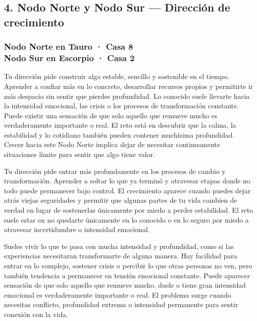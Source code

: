 \documentclass[11pt,a4paper]{article}
\begin{document}
\vspace{0.5cm}


\subsection{4. Nodo Norte y Nodo Sur — Dirección de crecimiento}

\subsubsection*{Nodo Norte en Tauro · Casa 8 \\
Nodo Sur en Escorpio · Casa 2}

Tu dirección pide construir algo estable, sencillo y sostenible en el tiempo. Aprender a confiar más en lo concreto, desarrollar recursos propios y permitirte ir más despacio sin sentir que pierdes profundidad. Lo conocido suele llevarte hacia la intensidad emocional, las crisis o los procesos de transformación constante. Puede existir una sensación de que solo aquello que remueve mucho es verdaderamente importante o real. El reto está en descubrir que la calma, la estabilidad y lo cotidiano también pueden contener muchísima profundidad. Crecer hacia este Nodo Norte implica dejar de necesitar continuamente situaciones límite para sentir que algo tiene valor.

Tu dirección pide entrar más profundamente en los procesos de cambio y transformación. Aprender a soltar lo que ya terminó y atravesar etapas donde no todo puede permanecer bajo control. El crecimiento aparece cuando puedes dejar atrás viejas seguridades y permitir que algunas partes de tu vida cambien de verdad en lugar de sostenerlas únicamente por miedo a perder estabilidad. El reto suele estar en no quedarte únicamente en lo conocido o en lo seguro por miedo a atravesar incertidumbre o intensidad emocional.

Sueles vivir lo que te pasa con mucha intensidad y profundidad, como si las experiencias necesitaran transformarte de alguna manera. Hay facilidad para entrar en lo complejo, sostener crisis o percibir lo que otras personas no ven, pero también tendencia a permanecer en tensión emocional constante. Puede aparecer sensación de que solo aquello que remueve mucho, duele o tiene gran intensidad emocional es verdaderamente importante o real. El problema surge cuando necesitas conflicto, profundidad extrema o intensidad permanente para sentir conexión con la vida.
\end{document}
